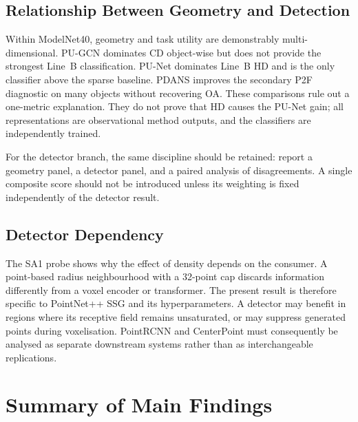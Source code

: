 \subsection{Relationship Between Geometry and Detection}
\label{sec:geometry-detection}

Within ModelNet40, geometry and task utility are demonstrably multi-dimensional. PU-GCN dominates CD object-wise but does not provide the strongest Line~B classification. PU-Net dominates Line~B HD and is the only classifier above the sparse baseline. PDANS improves the secondary P2F diagnostic on many objects without recovering OA. These comparisons rule out a one-metric explanation. They do not prove that HD causes the PU-Net gain; all representations are observational method outputs, and the classifiers are independently trained.

For the detector branch, the same discipline should be retained: report a geometry panel, a detector panel, and a paired analysis of disagreements. A single composite score should not be introduced unless its weighting is fixed independently of the detector result.

\subsection{Detector Dependency}
\label{sec:detector-dependency}

The SA1 probe shows why the effect of density depends on the consumer. A point-based radius neighbourhood with a 32-point cap discards information differently from a voxel encoder or transformer. The present result is therefore specific to PointNet++ SSG and its hyperparameters. A detector may benefit in regions where its receptive field remains unsaturated, or may suppress generated points during voxelisation. PointRCNN and CenterPoint must consequently be analysed as separate downstream systems rather than as interchangeable replications.

\section{Summary of Main Findings}
\label{sec:summary-findings}

